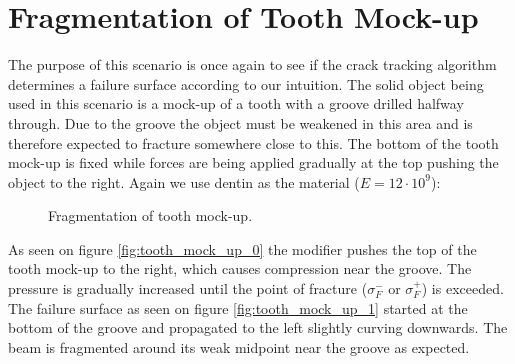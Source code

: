 \section{Fragmentation of Tooth Mock-up}
The purpose of this scenario is once again to see if the crack
tracking algorithm determines a failure surface according to our
intuition. The solid object being used in this scenario is a mock-up
of a tooth with a groove drilled halfway through. Due to the groove
the object must be weakened in this area and is therefore expected to
fracture somewhere close to this. The bottom of the tooth mock-up is fixed
while forces are being applied gradually at the top pushing the object
to the right. Again we use dentin as the material ($E = 12 \cdot 10^9$):

\begin{figure}
  \begin{minipage}[b]{0.5\linewidth}
    \centering
  \end{minipage}
  \hspace{0.5cm}
  \begin{minipage}[b]{0.5\linewidth}
    \centering
  \end{minipage}
  \caption{Fragmentation of tooth mock-up.}
  \label{fig:tooth_mock_up}
\end{figure}

As seen on figure \vref{fig:tooth_mock_up_0} the modifier pushes the
top of the tooth mock-up to the right, which causes compression near 
the groove. The pressure is gradually increased until the point of
fracture ($\sigma^-_F$ or $\sigma^+_F$) is exceeded. The failure
surface as seen on figure \vref{fig:tooth_mock_up_1} started at the
bottom of the groove and propagated to the left slightly curving
downwards. The beam is fragmented around its weak midpoint near the groove
as expected.    

